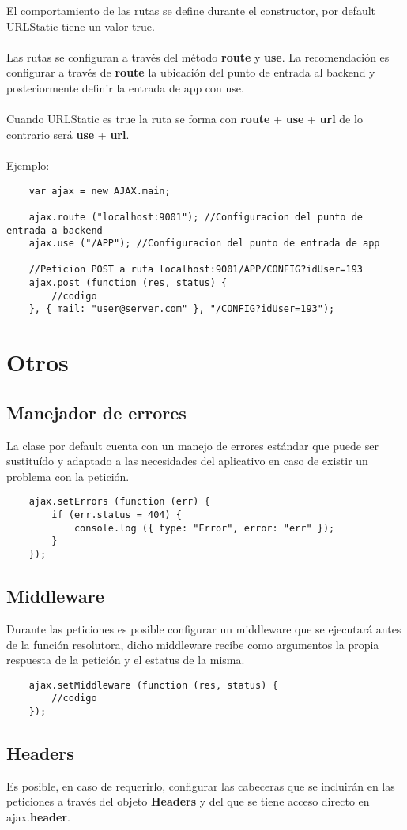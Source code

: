 \documentclass[10pt]{article}
\begin{document}
El comportamiento de las rutas se define durante el constructor, por default URLStatic tiene un valor true.
\\\\
Las rutas se configuran a través del método \textbf{route} y \textbf{use}. La recomendación es configurar a través de \textbf{route} la ubicación del punto de entrada al backend y posteriormente definir la entrada de app con use.
\\\\
Cuando URLStatic es true la ruta se forma con \textbf{route} + \textbf{use} + \textbf{url} de lo contrario será \textbf{use} + \textbf{url}.
\\\\
Ejemplo:
\begin{lstlisting}
	var ajax = new AJAX.main;
	
	ajax.route ("localhost:9001"); //Configuracion del punto de entrada a backend
	ajax.use ("/APP"); //Configuracion del punto de entrada de app
	
	//Peticion POST a ruta localhost:9001/APP/CONFIG?idUser=193
	ajax.post (function (res, status) {
		//codigo
	}, { mail: "user@server.com" }, "/CONFIG?idUser=193");
\end{lstlisting}

\section{Otros}

\subsection{Manejador de errores}

La clase por default cuenta con un manejo de errores estándar que puede ser sustituído y adaptado a las necesidades del aplicativo en caso de existir un problema con la petición.
\\
\begin{lstlisting}
	ajax.setErrors (function (err) {
		if (err.status = 404) {
			console.log ({ type: "Error", error: "err" });
		}
	});
\end{lstlisting}

\subsection{Middleware}

Durante las peticiones es posible configurar un middleware que se ejecutará antes de la función resolutora, dicho middleware recibe como argumentos la propia respuesta de la petición y el estatus de la misma.
\\
\begin{lstlisting}
	ajax.setMiddleware (function (res, status) {
		//codigo
	});
\end{lstlisting}

\subsection{Headers}

Es posible, en caso de requerirlo, configurar las cabeceras que se incluirán en las peticiones a través del objeto \textbf{Headers} y del que se tiene acceso directo en ajax.\textbf{header}.
\end{document}
